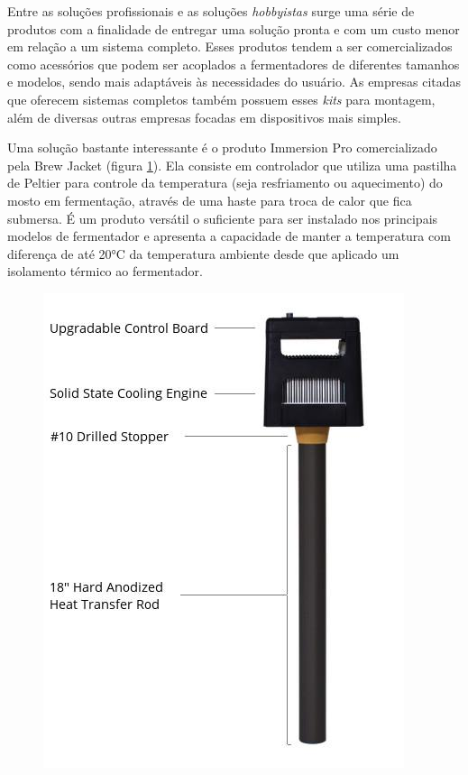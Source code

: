 Entre as soluções profissionais e as soluções \textit{hobbyistas} surge uma série de produtos com a finalidade de entregar uma solução pronta e com um custo menor em relação a um sistema completo. Esses produtos tendem a ser comercializados como acessórios que podem ser acoplados a fermentadores de diferentes tamanhos e modelos, sendo mais adaptáveis às necessidades do usuário. As empresas citadas que oferecem sistemas completos também possuem esses \textit{kits} para montagem, além de diversas outras empresas focadas em dispositivos mais simples.


Uma solução bastante interessante é o produto Immersion Pro comercializado pela Brew Jacket (figura \ref{fig:brewjacket}). Ela consiste em controlador que utiliza uma pastilha de Peltier para controle da temperatura (seja resfriamento ou aquecimento) do mosto em fermentação, através de uma haste para troca de calor que fica submersa. É um produto versátil o suficiente para ser instalado nos principais modelos de fermentador e apresenta a capacidade de manter a temperatura com diferença de até 20°C da temperatura ambiente desde que aplicado um isolamento térmico ao fermentador.

\begin{figure}[H]
    \centering
    \includegraphics[scale=0.45]{figuras/contexto/brewjacket.jpg}
    \label{fig:brewjacket}
\end{figure}

